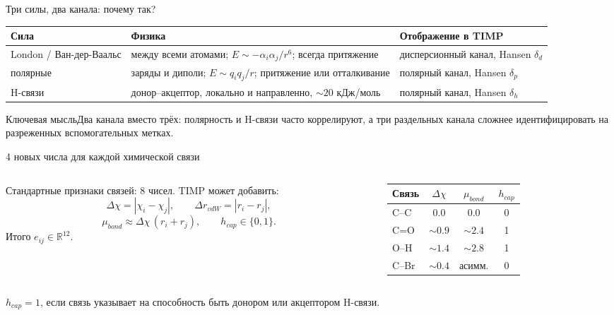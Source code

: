 \documentclass[aspectratio=169,10pt]{beamer}
\newcommand{\keybox}[1]{\begin{block}{Ключевая мысль}#1\end{block}}
\begin{document}
\begin{frame}{Три силы, два канала: почему так?}
  \small
  \begin{tabularx}{\textwidth}{lYY}
    \toprule
    \textbf{Сила} & \textbf{Физика} & \textbf{Отображение в TIMP}\\
    \midrule
    London / Ван-дер-Ваальс & между всеми атомами; $E\sim-\alpha_i\alpha_j/r^6$; всегда притяжение & дисперсионный канал, Hansen $\delta_d$\\
    полярные & заряды и диполи; $E\sim q_iq_j/r$; притяжение или отталкивание & полярный канал, Hansen $\delta_p$\\
    H-связи & донор–акцептор, локально и направленно, $\sim20$ кДж/моль & полярный канал, Hansen $\delta_h$\\
    \bottomrule
  \end{tabularx}
  \vspace{0.4em}
  \keybox{Два канала вместо трёх: полярность и H-связи часто коррелируют, а три раздельных канала сложнее идентифицировать на разреженных вспомогательных метках.}
\end{frame}

\begin{frame}{4 новых числа для каждой химической связи}
  \small
  \begin{columns}[T,onlytextwidth]
    \begin{column}{0.52\textwidth}
      Стандартные признаки связей: 8 чисел. TIMP может добавить:
      \[
        \Delta\chi=|\chi_i-\chi_j|,\qquad
        \Delta r_{vdW}=|r_i-r_j|,
      \]
      \[
        \mu_{bond}\approx\Delta\chi\,(r_i+r_j),\qquad
        h_{cap}\in\{0,1\}.
      \]
      Итого $e_{ij}\in\mathbb{R}^{12}$.
    \end{column}
    \begin{column}{0.44\textwidth}
      \scriptsize
      \begin{tabular}{lccc}
        \toprule
        \textbf{Связь} & $\Delta\chi$ & $\mu_{bond}$ & $h_{cap}$\\
        \midrule
        C–C & 0.0 & 0.0 & 0\\
        C=O & $\sim0.9$ & $\sim2.4$ & 1\\
        O–H & $\sim1.4$ & $\sim2.8$ & 1\\
        C–Br & $\sim0.4$ & асимм. & 0\\
        \bottomrule
      \end{tabular}
    \end{column}
  \end{columns}
  \par\vspace{0.45em}
  \begin{minipage}{0.92\textwidth}
    \scriptsize\color{TGSlate}
    $h_{cap}=1$, если связь указывает на способность быть донором или акцептором H-связи.
  \end{minipage}
\end{frame}
\end{document}
